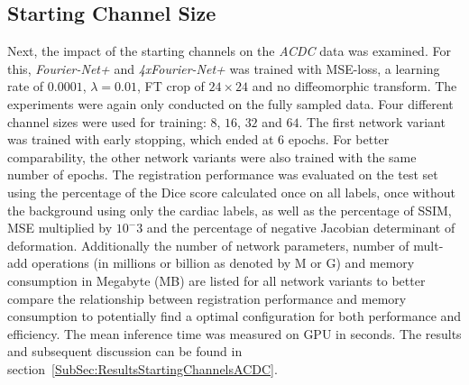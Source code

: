 \documentclass[english,version-2022-01]{uzl-thesis} %
\begin{document}
\subsection{Starting Channel Size} \label{SubSec:StartingChannelsACDC}
Next, the impact of the starting channels on the \emph{ACDC} data was examined. For this, \emph{Fourier-Net+} and \emph{4xFourier-Net+} was trained with MSE-loss, a learning rate of $0.0001$, $\lambda = 0.01$, FT crop of $24 \times 24$ and no diffeomorphic transform. The experiments were again only conducted on the fully sampled data. Four different channel sizes were used for training: $8$, $16$, $32$ and $64$. The first network variant was trained with early stopping, which ended at 6 epochs. For better comparability, the other network variants were also trained with the same number of epochs. The registration performance was evaluated on the test set using the percentage of the Dice score calculated once on all labels, once without the background using only the cardiac labels, as well as the percentage of SSIM, MSE multiplied by $10^-3$ and the percentage of negative Jacobian determinant of deformation. Additionally the number of network parameters, number of mult-add operations (in millions or billion as denoted by M or G) and memory consumption in Megabyte (MB) are listed for all network variants to better compare the relationship between registration performance and memory consumption to potentially find a optimal configuration for both performance and efficiency. The mean inference time was measured on GPU in seconds. The results and subsequent discussion can be found in section~\ref{SubSec:ResultsStartingChannelsACDC}.
\end{document}
